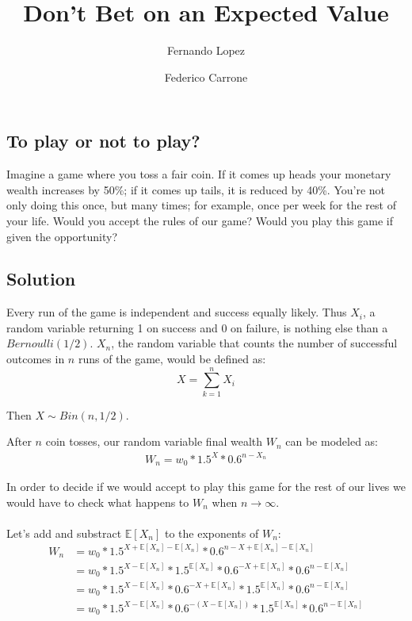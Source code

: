 \documentclass[12pt]{article}
\title{Don't Bet on an Expected Value}
\author{Fernando Lopez \and Federico Carrone}
\begin{document}
\maketitle
{}

\subsection{To play or not to play?}

Imagine a game where you toss a fair coin. If it comes up heads your monetary wealth increases by 50\%; if it comes up tails, it is reduced by 40\%. You’re not only doing this once, but many times; for example, once per week for the rest of your life. Would you accept the rules of our game? Would you play this game if given the opportunity?

\subsection{Solution}
Every run of the game is independent and success equally likely. Thus $X_i$, a random variable returning 1 on success and 0 on failure, is nothing else than a $Bernoulli(1/2)$. $X_n$, the random variable that counts the number of successful outcomes in $n$ runs of the game, would be defined as:
\begin{equation*}
 X = \sum\limits_{k=1}^{n} X_i
\end{equation*}

Then $X \sim Bin(n, 1/2)$.

After $n$ coin tosses, our random variable final wealth $W_n$ can be modeled as:
\begin{align}
  \begin{equation*}
    W_n = w_0 * 1.5^X * 0.6^{n-X_n}
  \end{equation*}
\end{align}

In order to decide if we would accept to play this game for the rest of our lives we would have to check what happens to $W_n$ when $n \rightarrow \infty$.
\\\\

Let's add and substract $\mathbb{E}[X_n]$ to the exponents of $W_n$:
\begin{equation*}
  \begin{split}
    W_n &= w_0 * 1.5^{X + \mathbb{E}[X_n] - \mathbb{E}[X_n]} * 0.6^{n - X + \mathbb{E}[X_n] - \mathbb{E}[X_n]} \\
    & = w_0 *  1.5^{X - \mathbb{E}[X_n]}*1.5^{\mathbb{E}[X_n]} * 0.6^{- X + \mathbb{E}[X_n]} * 0.6^{n - \mathbb{E}[X_n]} \\
    & = w_0 *  1.5^{X - \mathbb{E}[X_n]} * 0.6^{- X + \mathbb{E}[X_n]} * 1.5^{\mathbb{E}[X_n]} * 0.6^{n - \mathbb{E}[X_n]}\\
    & = w_0 *  1.5^{X - \mathbb{E}[X_n]} * 0.6^{- (X - \mathbb{E}[X_n])} * 1.5^{\mathbb{E}[X_n]} * 0.6^{n - \mathbb{E}[X_n]}
  \end{split}
\end{equation*}
\end{document}
